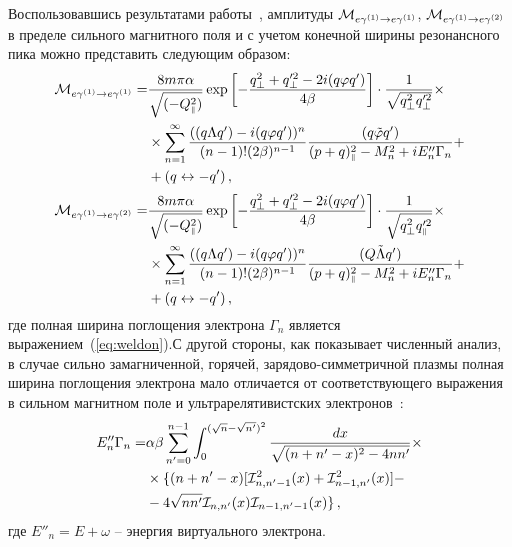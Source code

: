 Воспользовавшись результатами работы~\cite{Chistyakov:2009}, амплитуды ${\cal M}_{e\gamma^{(1)}\to e\gamma^{(1)}}$, ${\cal M}_{e\gamma^{(1)}\to e\gamma^{(2)}}$ в пределе сильного магнитного поля и с учетом конечной ширины резонансного пика можно представить следующим образом:
\begin{equation}\label{Mres}
	\begin{aligned}
		{\cal M}_{e\gamma^{(1)}\to e\gamma^{(1)}}=& \frac{8m\pi\alpha}{\sqrt{(-Q^2_{\mbox{\tiny $\|$}})}} \exp\left[-\frac{q^2_\perp+q'^2_\perp-2i(q\varphi q')}{4\beta}\right]\cdot\frac{1}{\sqrt{q^2_\perp q'^2_\perp}}\times 
		\\ &\times \sum_{n=1}^{\infty}\frac{((q\Lambda
			q')-i(q\varphi
			q'))^{n}}{(n-1)!(2\beta)^{n-1}}
		\frac{(q\tilde{\varphi}q')}{(p+q)^2_{\mbox{\tiny $\|$}}-M_n^2+iE''_n\Gamma_n }+\\
		&+(q\leftrightarrow-q')\, ,
	\end{aligned}
\end{equation}
\begin{equation}\label{Mres12}
	\begin{aligned}
		{\cal M}_{e\gamma^{(1)}\to e\gamma^{(2)}}=& \frac{8m\pi\alpha}{\sqrt{(-Q^2_{\mbox{\tiny $\|$}})}} \exp\left[-\frac{q^2_\perp+q'^2_\perp-2i(q\varphi q')}{4\beta}\right]\cdot\frac{1}{\sqrt{q^2_\perp q'^2_{\mbox{\tiny $\|$}}}}\times 
		\\ &\times \sum_{n=1}^{\infty}\frac{((q\Lambda
			q')-i(q\varphi
			q'))^{n}}{(n-1)!(2\beta)^{n-1}}
		\frac{(Q\tilde{\Lambda}q')}{(p+q)^2_{\mbox{\tiny $\|$}}-M_n^2+iE''_n\Gamma_n }+\\
		&+(q\leftrightarrow-q')\, ,
	\end{aligned}
\end{equation}
где полная ширина поглощения электрона $\Gamma_n$  является выражением~(\ref{eq:weldon}).С другой стороны, как показывает численный анализ, в случае сильно замагниченной, горячей, зарядово-симметричной плазмы полная ширина поглощения электрона мало отличается от соответствующего выражения в сильном магнитном поле и ультрарелятивистских электронов~\cite{KM_Book_2013}:
\begin{equation}\label{Shir}
	\begin{aligned}
		E''_n\Gamma_n=&\alpha \beta \sum_{n'=0}^{n-1}\int_{0}^{(\sqrt{n}-\sqrt{n'})^2}\frac{dx}{\sqrt{(n+n'-x)^2-4n n'}}\times\\
		&\times\{(n+n'-x)[{\cal I}^2_{n,n'-1}(x)+{\cal I}^2_{n-1,n'}(x)]-\\
		&-4\sqrt{nn'}{\cal I}_{n,n'}(x){\cal I}_{n-1,n'-1}(x)\}\, ,
	\end{aligned}
\end{equation}
где $E''_n=E+\omega$ -- энергия виртуального электрона.

